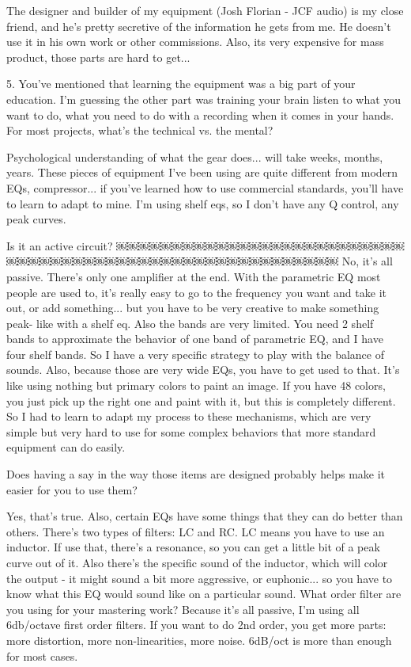The designer and builder of my equipment (Josh Florian - JCF audio) is my close friend, and he's pretty secretive of the information he gets from me. He doesn't use it in his own work or other commissions. Also, its very expensive for mass product, those parts are hard to get...

5. You've mentioned that learning the equipment was a big part of your education. I'm guessing the other part was training your brain listen to what you want to do, what you need to do with a recording when it comes in your hands. For most projects, what's the technical vs. the mental?

Psychological understanding of what the gear does... will take weeks, months, years. These pieces of equipment I've been using are quite different from modern EQs, compressor... if you've learned how to use commercial standards, you'll have to learn to adapt to mine. I'm using shelf eqs, so I don't have any Q control, any peak curves.

Is it an active circuit?
￼￼￼￼￼￼￼￼￼￼￼￼￼￼￼￼￼￼￼￼￼￼￼￼￼￼￼￼￼￼￼￼￼￼￼￼￼￼￼￼￼￼￼￼￼￼￼￼￼￼￼￼￼￼￼￼
No, it's all passive. There's only one amplifier at the end. With the parametric EQ most people are used to, it's really easy to go to the frequency you want and take it out, or add something... but you have to be very creative to make something peak- like with a shelf eq. Also the bands are very limited. You need 2 shelf bands to approximate the behavior of one band of parametric EQ, and I have four shelf bands. So I have a very specific strategy to play with the balance of sounds. Also, because those are very wide EQs, you have to get used to that. It's like using nothing but primary colors to paint an image. If you have 48 colors, you just pick up the right one and paint with it, but this is completely different. So I had to learn to adapt my process to these mechanisms, which are very simple but very hard to use for some complex behaviors that more standard equipment can do easily.

Does having a say in the way those items are designed probably helps make it easier for you to use them?

Yes, that's true. Also, certain EQs have some things that they can do better than others. There's two types of filters: LC and RC. LC means you have to use an inductor. If use that, there's a resonance, so you can get a little bit of a peak curve out of it. Also there's the specific sound of the inductor, which will color the output - it might sound a bit more aggressive, or euphonic... so you have to know what this EQ would sound like on a particular sound.
What order filter are you using for your mastering work?
Because it's all passive, I'm using all 6db/octave first order filters. If you want to do 2nd order, you get more parts: more distortion, more non-linearities, more noise. 6dB/oct is more than enough for most cases.

